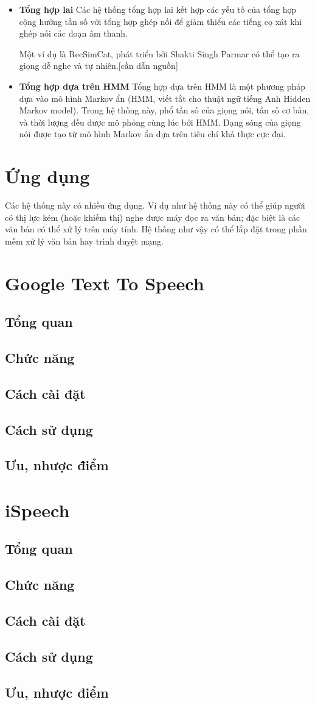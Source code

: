 \begin{itemize}
\item \textbf{Tổng hợp lai}
Các hệ thống tổng hợp lai kết hợp các yếu tố của tổng hợp cộng hưởng tần số với tổng hợp ghép nối để giảm thiểu các tiếng cọ xát khi ghép nối các đoạn âm thanh.

Một ví dụ là RecSimCat, phát triển bởi Shakti Singh Parmar có thể tạo ra giọng dễ nghe và tự nhiên.[cần dẫn nguồn]

\item \textbf{Tổng hợp dựa trên HMM}
Tổng hợp dựa trên HMM là một phương pháp dựa vào mô hình Markov ẩn (HMM, viết tắt cho thuật ngữ tiếng Anh Hidden Markov model). Trong hệ thống này, phổ tần số của giọng nói, tần số cơ bản, và thời lượng đều được mô phỏng cùng lúc bởi HMM. Dạng sóng của giọng nói được tạo từ mô hình Markov ẩn dựa trên tiêu chí khả thực cực đại.
\end{itemize}
\section{Ứng dụng}
Các hệ thống này có nhiều ứng dụng. Ví dụ như hệ thống này có thể giúp người có thị lực kém (hoặc khiếm thị) nghe được máy đọc ra văn bản; đặc biệt là các văn bản có thể xử lý trên máy tính. Hệ thống như vậy có thể lắp đặt trong phần mềm xử lý văn bản hay trình duyệt mạng.
\section{Google Text To Speech}
\subsection{Tổng quan}
\subsection{Chức năng}
\subsection{Cách cài đặt}
\subsection{Cách sử dụng}
\subsection{Ưu, nhược điểm}
\section{iSpeech}
\subsection{Tổng quan}
\subsection{Chức năng}
\subsection{Cách cài đặt}
\subsection{Cách sử dụng}
\subsection{Ưu, nhược điểm}